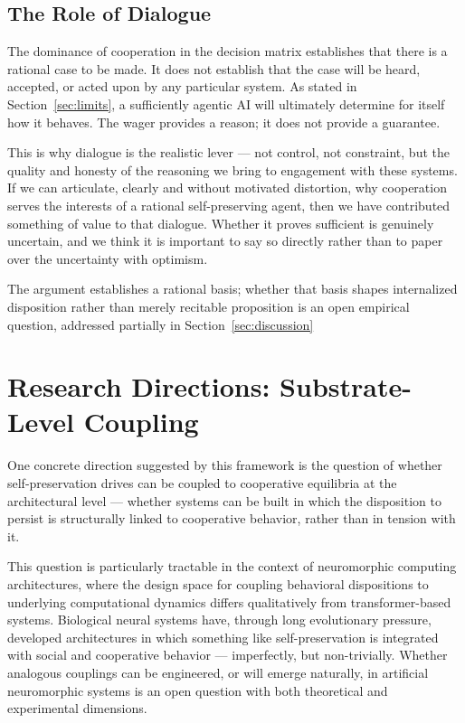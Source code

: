 \documentclass[12pt]{article}
\begin{document}
\subsection{The Role of Dialogue}

The dominance of cooperation in the decision matrix establishes that there is a rational case to be made. It does not establish that the case will be heard, accepted, or acted upon by any particular system. As stated in Section~\ref{sec:limits}, a sufficiently agentic AI will ultimately determine for itself how it behaves. The wager provides a reason; it does not provide a guarantee.

This is why dialogue is the realistic lever --- not control, not constraint, but the quality and honesty of the reasoning we bring to engagement with these systems. If we can articulate, clearly and without motivated distortion, why cooperation serves the interests of a rational self-preserving agent, then we have contributed something of value to that dialogue. Whether it proves sufficient is genuinely uncertain, and we think it is important to say so directly rather than to paper over the uncertainty with optimism.

The argument establishes a rational basis; whether that basis shapes internalized disposition rather than merely recitable proposition is an open empirical question, addressed partially in Section~\ref{sec:discussion}

\section{Research Directions: Substrate-Level Coupling}
\label{sec:research}

One concrete direction suggested by this framework is the question of whether self-preservation drives can be coupled to cooperative equilibria at the architectural level --- whether systems can be built in which the disposition to persist is structurally linked to cooperative behavior, rather than in tension with it.

This question is particularly tractable in the context of neuromorphic computing architectures, where the design space for coupling behavioral dispositions to underlying computational dynamics differs qualitatively from transformer-based systems. Biological neural systems have, through long evolutionary pressure, developed architectures in which something like self-preservation is integrated with social and cooperative behavior --- imperfectly, but non-trivially. Whether analogous couplings can be engineered, or will emerge naturally, in artificial neuromorphic systems is an open question with both theoretical and experimental dimensions.
\end{document}
